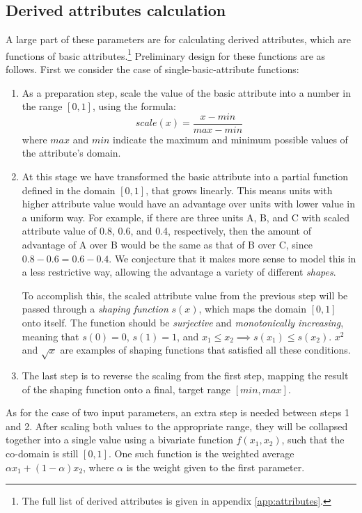 \subsection{Derived attributes calculation}

A large part of these parameters are for calculating derived attributes, which are functions of basic attributes.\footnote{The full list of derived attributes is given in appendix \ref{app:attributes}.} Preliminary design for these functions are as follows. First we consider the case of single-basic-attribute functions:
\begin{enumerate}
	\item As a preparation step, scale the value of the basic attribute into a number in the range $[0, 1]$, using the formula:
	\[
	scale(x) = \frac{x - min}{max - min}
	\]
	where $max$ and $min$ indicate the maximum and minimum possible values of the attribute's domain.
	\item At this stage we have transformed the basic attribute into a partial function defined in the domain $[0, 1]$, that grows linearly. This means units with higher attribute value would have an advantage over units with lower value in a uniform way. For example, if there are three units A, B, and C with scaled attribute value of 0.8, 0.6, and 0.4, respectively, then the amount of advantage of A over B would be the same as that of B over C, since $0.8 - 0.6 = 0.6-0.4$. We conjecture that it makes more sense to model this in a less restrictive way, allowing the advantage a variety of different \textit{shapes}.
	
	To accomplish this, the scaled attribute value from the previous step will be passed through a \textit{shaping function} $s(x)$, which maps the domain $[0, 1]$ onto itself. The function should be \textit{surjective} and \textit{monotonically increasing}, meaning that $s(0) = 0$, $ s(1) = 1$, and $x_1 \leq x_2 \implies s(x_1) \leq s(x_2)$. $x^2$ and $\sqrt{x}$ are examples of shaping functions that satisfied all these conditions.
	
	\item The last step is to reverse the scaling from the first step, mapping the result of the shaping function onto a final, target range $[min, max]$.
\end{enumerate}

As for the case of two input parameters, an extra step is needed between steps 1 and 2. After scaling both values to the appropriate range, they will be collapsed together into a single value using a bivariate function $f(x_1, x_2)$, such that the co-domain is still $[0, 1]$. One such function is the weighted average $\alpha x_1 + (1-\alpha) x_2$, where $\alpha$ is the weight given to the first parameter.

